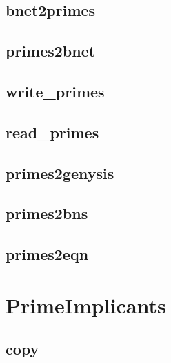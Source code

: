 \documentclass[letterpaper,10pt,english]{sphinxmanual}
\begin{document}
\subsection{bnet2primes}
\label{FileExchange:id2}\label{FileExchange:bnet2primes}

\subsection{primes2bnet}
\label{FileExchange:primes2bnet}\label{FileExchange:id3}

\subsection{write\_primes}
\label{FileExchange:write-primes}\label{FileExchange:id4}

\subsection{read\_primes}
\label{FileExchange:id5}\label{FileExchange:read-primes}

\subsection{primes2genysis}
\label{FileExchange:id6}\label{FileExchange:primes2genysis}

\subsection{primes2bns}
\label{FileExchange:id7}\label{FileExchange:primes2bns}

\subsection{primes2eqn}
\label{FileExchange:primes2eqn}\label{FileExchange:id8}

\section{PrimeImplicants}
\label{PrimeImplicants:networkx-has-path}\label{PrimeImplicants::doc}\label{PrimeImplicants:primeimplicants}\label{PrimeImplicants:id1}

\subsection{copy}
\label{PrimeImplicants:copy}\label{PrimeImplicants:primes-copy}
\end{document}
